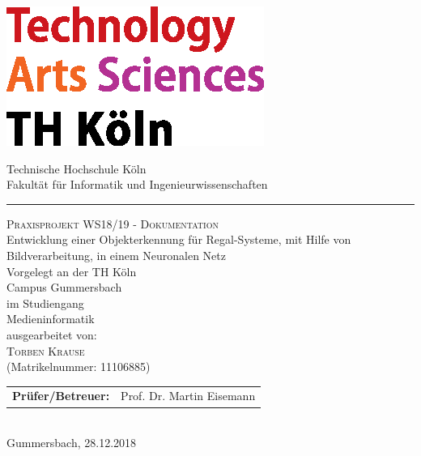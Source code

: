 \documentclass[a4paper,12pt,oneside]{article}
\begin{document}
  
  \pagestyle{empty}
  \begin{titlepage}
    \includegraphics[scale=1.00]{Sources/logo_TH-Koeln_CMYK_22pt}\\
    \begin{center}
      \Large
      Technische Hochschule Köln\\
      Fakultät für Informatik und Ingenieurwissenschaften\\
      \hrule\par\rule{0pt}{2cm} %
      \LARGE
      \textsc{Praxisprojekt WS18/19 - Dokumentation}\\
      \vspace{1cm} %
      \huge
      Entwicklung einer Objekterkennung für Regal-Systeme,
      mit Hilfe von Bildverarbeitung, in einem Neuronalen Netz\\
      \vspace{1 cm}
      \large
      Vorgelegt an der TH Köln\\
      Campus Gummersbach\\
      im Studiengang\\
      Medieninformatik\\ 
      \vspace{1.0cm}
      ausgearbeitet von:\\
      \textsc{Torben Krause}\\
      (Matrikelnummer: 11106885)\\
      \vspace{1.5cm}
      \begin{tabular}{ll} %
          \textbf{Prüfer/Betreuer:} & Prof. Dr. Martin Eisemann \\
      \end{tabular}
      \vspace{1.5cm}
      \\Gummersbach, 28.12.2018
    \end{center}    
  \end{titlepage}
  
\end{document}
